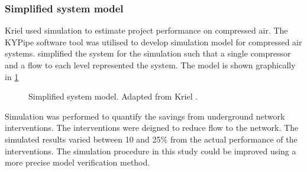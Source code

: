 \subsubsection{Simplified system  model}
Kriel \cite{Kriel2014Masters} used simulation to estimate project performance on compressed air. The KYPipe software tool was utilised to develop simulation model for compressed air systems. \cite{Kriel2014Masters} simplified the system for the simulation such that a single compressor and a flow to each level represented the system. The model is shown graphically in \cref{fig:kriel  model}
\begin{figure}[h!]
	\centering
	\caption[Simplified system model.]{Simplified system model. Adapted from Kriel \cite{Kriel2014Masters}.}
	\label{fig:kriel  model}
\end{figure}
\par 
Simulation was performed to quantify the savings from underground network interventions. The interventions were deigned to reduce flow to the network. The simulated results varied between 10 and 25\% from the actual performance of the interventions. The simulation procedure in this study could be improved using a more precise model verification method.
\par 


